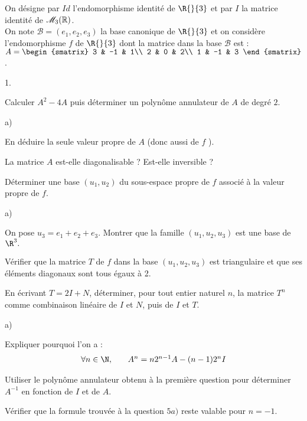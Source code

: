 \documentclass[11pt]{article}%
\begin{document}
On désigne par $Id$ l'endomorphisme identité de $\R{}{3}$
et par $I$ la matrice identité de $\mathscr{M}_{3}(\mathbb{R})$. \\
 On note $\mathcal{B} = (e_{1},e_{2},e_{3})$ la base canonique de
$\R{}{3}$
et on considère l'endomorphisme $f$ de $\R{}{3}$ dont la
matrice dans la base $\mathcal{B}$ est : $A = 
\begin{smatrix}
3 & -1 & 1\\
2 & 0 & 2\\
1 & -1 & 3
\end{smatrix}
$. 
\begin{noliste}{1.}
 \setlength{\itemsep}{4mm}
\item Calculer $A^{2}-4A$ puis déterminer un polynôme annulateur de $A$
de degré $2$. 
\item 

\begin{noliste}{a)}
 \setlength{\itemsep}{2mm}
\item En déduire la seule valeur propre de $A$ (donc aussi de $f$ ).\\

\item La matrice $A$ est-elle diagonalisable ? Est-elle inversible ? 
\end{noliste}
\item Déterminer une base $(u_{1},u_{2})$ du sous-espace propre de $f$
associé à la valeur propre de $f$. 
\item 

\begin{noliste}{a)}
 \setlength{\itemsep}{2mm}
\item On pose $u_{3} = e_{1} + e_{2} + e_{3}$. Montrer que la famille
$(u_{1},u_{2},u_{3})$
est une base de $\R^{3}.$ 
\item Vérifier que la matrice $T$ de $f$ dans la base
$(u_{1},u_{2},u_{3})$
est triangulaire et que ses éléments diagonaux sont tous égaux à 2. 
\item En écrivant $T = 2I + N$, déterminer, pour tout entier naturel
$n$, la matrice $T^{n}$ comme combinaison linéaire de $I$ et $N$,
puis de $I$ et $T$. 
\end{noliste}
\item 

\begin{noliste}{a)}
 \setlength{\itemsep}{2mm}
\item Expliquer pourquoi l'on a : 
\[
\begin{array}{lll}
\forall n\in\N, & & A^{n} = n2^{n-1}A-(n-1)2^{n}I
\end{array}
\]

\item Utiliser le polynôme annulateur obtenu à la première question
pour
déterminer $A^{-1}$ en fonction de $I$ et de $A$. 
\item Vérifier que la formule trouvée à la question $5a)$ reste valable
pour $n = -1$. 
\end{noliste}
\end{noliste}
\end{document}
